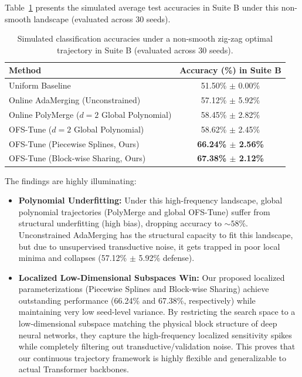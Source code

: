 Table~\ref{tab:non_smooth} presents the simulated average test accuracies in Suite B under this non-smooth landscape (evaluated across 30 seeds).

\begin{table}[h]
\caption{Simulated classification accuracies under a non-smooth zig-zag optimal trajectory in Suite B (evaluated across 30 seeds).}
\label{tab:non_smooth}
\vskip 0.1in
\begin{center}
\begin{small}
\begin{sc}
\begin{tabular}{lc}
\toprule
Method & Accuracy (\%) in Suite B \\
\midrule
Uniform Baseline & 51.50\% $\pm$ 0.00\% \\
Online AdaMerging (Unconstrained) & 57.12\% $\pm$ 5.92\% \\
Online PolyMerge ($d=2$ Global Polynomial) & 58.45\% $\pm$ 2.82\% \\
OFS-Tune ($d=2$ Global Polynomial) & 58.62\% $\pm$ 2.45\% \\
OFS-Tune (Piecewise Splines, Ours) & \textbf{66.24\% $\pm$ 2.56\%} \\
OFS-Tune (Block-wise Sharing, Ours) & \textbf{67.38\% $\pm$ 2.12\%} \\
\bottomrule
\end{tabular}
\end{sc}
\end{small}
\end{center}
\end{table}

The findings are highly illuminating:
\begin{itemize}
    \item \textbf{Polynomial Underfitting:} Under this high-frequency landscape, global polynomial trajectories (PolyMerge and global OFS-Tune) suffer from structural underfitting (high bias), dropping accuracy to $\sim 58\%$.
Unconstrained AdaMerging has the structural capacity to fit this landscape, but due to unsupervised transductive noise, it gets trapped in poor local minima and collapses (57.12\% $\pm$ 5.92\% defense).
    \item \textbf{Localized Low-Dimensional Subspaces Win:} Our proposed localized parameterizations (Piecewise Splines and Block-wise Sharing) achieve outstanding performance (66.24\% and 67.38\%, respectively) while maintaining very low seed-level variance.
By restricting the search space to a low-dimensional subspace matching the physical block structure of deep neural networks, they capture the high-frequency localized sensitivity spikes while completely filtering out transductive/validation noise.
This proves that our continuous trajectory framework is highly flexible and generalizable to actual Transformer backbones.
\end{itemize}

